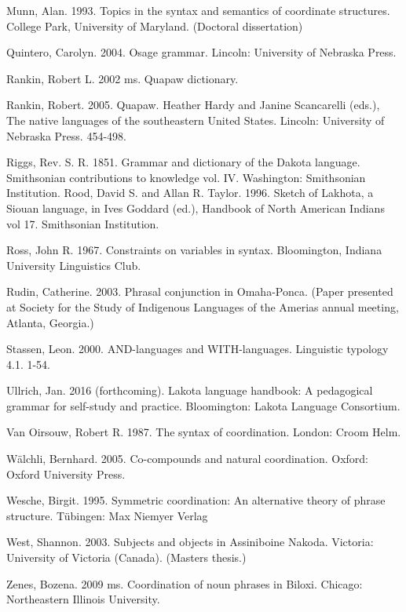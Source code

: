 \documentclass[output=paper]{LSP/langsci}
\begin{document}
\begin{reflist}
Munn, Alan. 1993. Topics in the syntax and semantics of coordinate structures. College Park, University of Maryland. (Doctoral dissertation)

Quintero, Carolyn. 2004. Osage grammar. Lincoln: University of Nebraska Press.

Rankin, Robert L. 2002 ms. Quapaw dictionary.

Rankin, Robert. 2005. Quapaw. Heather Hardy and Janine Scancarelli (eds.), The native languages of the southeastern United States. Lincoln: University of Nebraska Press. 454-498.

Riggs, Rev. S. R. 1851.  Grammar and dictionary of the Dakota language.  Smithsonian contributions to knowledge vol. IV. Washington: Smithsonian Institution.
Rood, David S. and Allan R. Taylor. 1996. Sketch of Lakhota, a Siouan language, in Ives Goddard (ed.), Handbook of North American Indians vol 17. Smithsonian Institution. 

Ross, John R. 1967. Constraints on variables in syntax. Bloomington, Indiana University Linguistics Club.

Rudin, Catherine. 2003. Phrasal conjunction in Omaha-Ponca. (Paper presented at Society for the Study of Indigenous Languages of the Amerias annual meeting, Atlanta, Georgia.)

Stassen, Leon. 2000. AND-languages and WITH-languages. Linguistic typology 4.1. 1-54.

Ullrich, Jan. 2016 (forthcoming). Lakota language handbook: A pedagogical grammar for self-study and practice. Bloomington: Lakota Language Consortium. 

Van Oirsouw, Robert R. 1987. The syntax of coordination. London: Croom Helm. 

W\"alchli, Bernhard. 2005. Co-compounds and natural coordination. Oxford: Oxford University Press. 

Wesche, Birgit. 1995. Symmetric coordination: An alternative theory of phrase structure. T\"ubingen: Max Niemyer Verlag

West, Shannon. 2003. Subjects and objects in Assiniboine Nakoda. Victoria: University of Victoria (Canada). (Masters thesis.) 

Zenes, Bozena. 2009 ms. Coordination of noun phrases in Biloxi. Chicago: Northeastern Illinois University.

\end{reflist}
\end{document}
